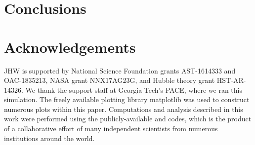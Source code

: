 \documentclass[a4paper,fleqn,usenatbib]{mnras}
\begin{document}
\section{Conclusions}

\section*{Acknowledgements}

JHW is supported by National Science Foundation grants AST-1614333 and
OAC-1835213, NASA grant NNX17AG23G, and Hubble theory grant
HST-AR-14326.  We thank the support staff at Georgia Tech's PACE,
where we ran this simulation.  The freely available plotting library
{\sc matplotlib} \citep{matplotlib} was used to construct numerous
plots within this paper. Computations and analysis described in this
work were performed using the publicly-available \enzo{} and \yt{}
codes, which is the product of a collaborative effort of many
independent scientists from numerous institutions around the world.










\appendix



\bsp	%
\label{lastpage}
\end{document}
